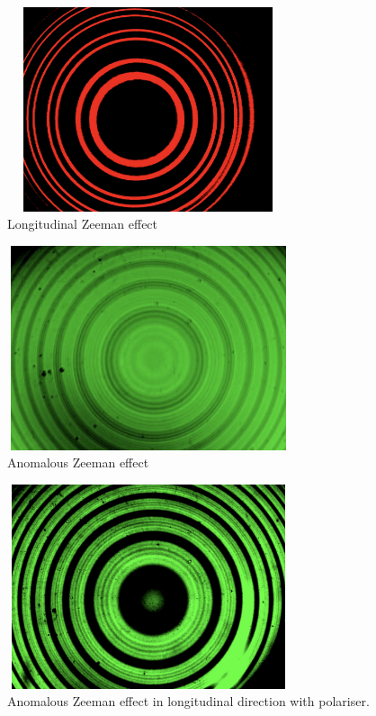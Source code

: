 \documentclass[a4paper, amsfonts, amssymb, amsmath, reprint, showkeys, nofootinbib, twoside]{revtex4-1}
\begin{document}
\begin{figure}[H] %
	\centering
	\includegraphics[width=8.3cm,height=6cm]{long} 
	\caption{Longitudinal Zeeman effect}
	\label{1}
\end{figure}

\begin{figure}[H] %
	\centering
	\includegraphics[width=8.3cm,height=6cm]{an} 
	\caption{Anomalous  Zeeman effect}
	\label{p}
\end{figure}

\begin{figure}[H] %
	\centering
	\includegraphics[width=8.3cm,height=6cm]{lwp} 
	\caption{Anomalous  Zeeman effect in longitudinal direction with polariser.}
	\label{ss}
\end{figure}
\end{document}
